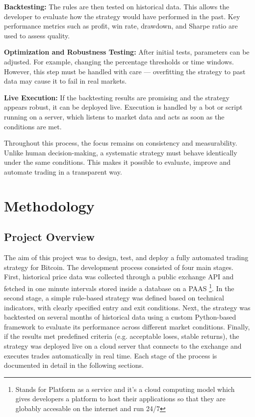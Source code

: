 \documentclass[12pt]{article}
\begin{document}
\textbf{Backtesting:}  
The rules are then tested on historical data. This allows the developer to evaluate how the strategy would have performed in the past. Key performance metrics such as profit, win rate, drawdown, and Sharpe ratio are used to assess quality.

\textbf{Optimization and Robustness Testing:}  
After initial tests, parameters can be adjusted. For example, changing the percentage thresholds or time windows. However, this step must be handled with care — overfitting the strategy to past data may cause it to fail in real markets.

\textbf{Live Execution:}  
If the backtesting results are promising and the strategy appears robust, it can be deployed live. Execution is handled by a bot or script running on a server, which listens to market data and acts as soon as the conditions are met.

Throughout this process, the focus remains on consistency and measurability. Unlike human decision-making, a systematic strategy must behave identically under the same conditions. This makes it possible to evaluate, improve and automate trading in a transparent way.



\newpage
\section{Methodology}

\subsection{Project Overview}
The aim of this project was to design, test, and deploy a fully automated trading strategy for Bitcoin. The development process consisted of four main stages. First, historical price data was collected through a public exchange API and fetched in one minute intervals stored inside a database on a PAAS \footnote{Stands for Platform as a service and it's a cloud computing model which gives developers a platform to host their applications so that they are globably accesable on the internet and run 24/7}. In the second stage, a simple rule-based strategy was defined based on technical indicators, with clearly specified entry and exit conditions. Next, the strategy was backtested on several months of historical data using a custom Python-based framework to evaluate its performance across different market conditions. Finally, if the results met predefined criteria (e.g. acceptable loses, stable returns), the strategy was deployed live on a cloud server that connects to the exchange and executes trades automatically in real time. Each stage of the process is documented in detail in the following sections.
\end{document}
